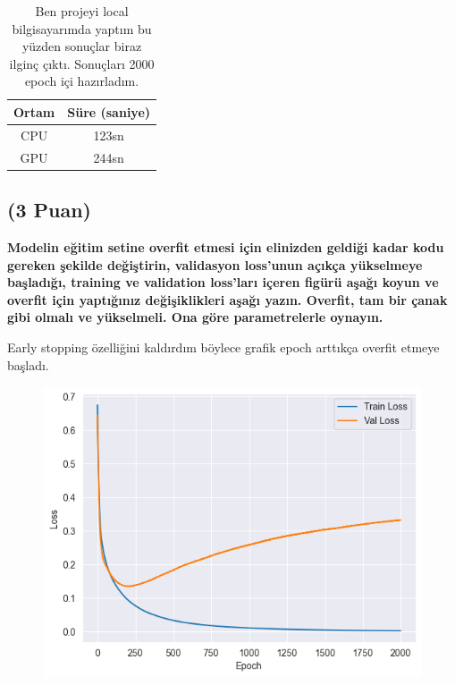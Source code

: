 \documentclass[11pt]{article}
\begin{document}
\begin{table}[ht!]
    \centering
    \caption{Ben projeyi local bilgisayarımda yaptım bu yüzden sonuçlar biraz ilginç çıktı. Sonuçları 2000 epoch içi hazırladım. }
    \begin{tabular}{c|c}
        Ortam & Süre (saniye) \\\hline
        CPU & 123sn \\
        GPU & 244sn\\
    \end{tabular}
    \label{tab:my_table}
\end{table}

\pagebreak

\subsection{(3 Puan)} \textbf{Modelin eğitim setine overfit etmesi için elinizden geldiği kadar kodu gereken şekilde değiştirin, validasyon loss'unun açıkça yükselmeye başladığı, training ve validation loss'ları içeren figürü aşağı koyun ve overfit için yaptığınız değişiklikleri aşağı yazın. Overfit, tam bir çanak gibi olmalı ve yükselmeli. Ona göre parametrelerle oynayın.}

Early stopping özelliğini kaldırdım böylece grafik epoch arttıkça overfit etmeye başladı.

\begin{figure}[ht!]
    \centering
    \includegraphics{soru5_overfit.png}
    \caption{}
    \label{fig:my_psic}
\end{figure}
    
\end{document}
